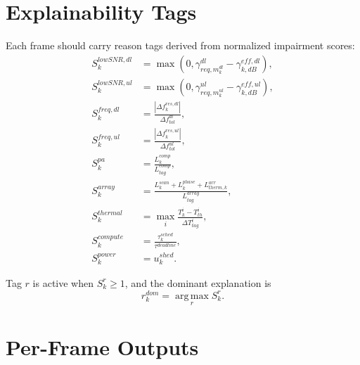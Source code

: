 \documentclass[11pt]{article}
\newcommand{\argmax}{\operatorname*{arg\,max}}
\begin{document}
\section{Explainability Tags}

Each frame should carry reason tags derived from normalized impairment scores:
\begin{align}
  S^{lowSNR,dl}_k &= \max(0, \gamma^{dl}_{req,m^{dl}_k} - \gamma^{eff,dl}_{k,dB}), \\
  S^{lowSNR,ul}_k &= \max(0, \gamma^{ul}_{req,m^{ul}_k} - \gamma^{eff,ul}_{k,dB}), \\
  S^{freq,dl}_k &= \frac{|\Delta f^{res,dl}_k|}{\Delta f^{dl}_{tol}}, \\
  S^{freq,ul}_k &= \frac{|\Delta f^{res,ul}_k|}{\Delta f^{ul}_{tol}}, \\
  S^{pa}_k &= \frac{L^{comp}_k}{L^{comp}_{tag}}, \\
  S^{array}_k &= \frac{L^{scan}_k + L^{phase}_k + L^{arr}_{therm,k}}{L^{array}_{tag}}, \\
  S^{thermal}_k &= \max_i \frac{T^i_k - T^i_{th}}{\Delta T^i_{tag}}, \\
  S^{compute}_k &= \frac{\tau^{sched}_k}{\tau^{deadline}}, \\
  S^{power}_k &= u^{shed}_k.
\end{align}

Tag $r$ is active when $S^r_k \ge 1$, and the dominant explanation is
\begin{equation}
  r^{dom}_k = \argmax_r S^r_k.
\end{equation}

\section{Per-Frame Outputs}
\end{document}
